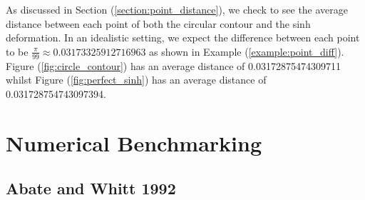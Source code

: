 \documentclass[a4paper]{report}
\begin{document}
As discussed in Section (\ref{section:point_distance}), we check to see the average distance between each point of both the circular contour and the sinh deformation. In an idealistic setting, we expect the difference between each point to be $\frac{\pi}{99} \approx 0.03173325912716963$ as shown in Example (\ref{example:point_diff}). Figure (\ref{fig:circle_contour}) has an average distance of 0.03172875474309711  whilst Figure (\ref{fig:perfect_sinh}) has an average distance of 0.031728754743097394.

\section{Numerical Benchmarking}

\subsection{Abate and Whitt 1992}
\end{document}
